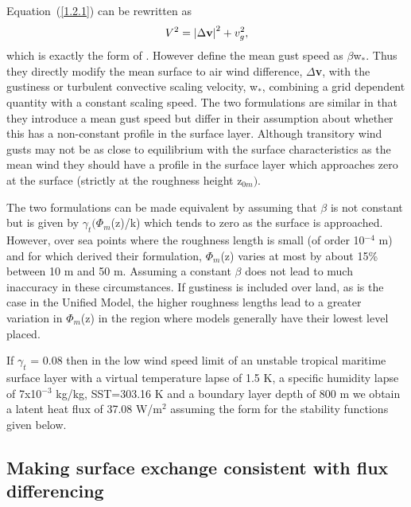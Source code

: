 \documentclass{UMDP_article}
\begin{document}
Equation~(\ref{1.2.1}) can be rewritten as
\begin{equation}
  V^2 = \left| {\Delta {{\rm {\bf v}}}} \right|^2 +  v_g^2,
  \label{1.2.4}
\end{equation}
which is exactly the form of \cite{godfrey1991}. However
\cite{godfrey1991} define the mean gust speed as $\beta $w$_{\ast
}$. Thus they directly modify the mean surface to air wind difference,
$\Delta $\textbf{v}, with the gustiness or turbulent convective
scaling velocity, w$_{\ast }$, combining a grid dependent quantity
with a constant scaling speed. The two formulations are similar in
that they introduce a mean gust speed but differ in their assumption
about whether this has a non-constant profile in the surface
layer. Although transitory wind gusts may not be as close to
equilibrium with the surface characteristics as the mean wind they
should have a profile in the surface layer which approaches zero at
the surface (strictly at the roughness height z$_{0m})$.

The two formulations can be made equivalent by assuming that
\cite{godfrey1991} $\beta $ is not constant but is given by $\gamma
_{t}(\Phi _{m}$(z)/k) which tends to zero as the surface is
approached. However, over sea points where the roughness length is
small (of order 10$^{-4}$ m) and for which \cite{godfrey1991} derived
their formulation, $\Phi_{m}$(z) varies at most by about 15{\%}
between 10 m and 50 m. Assuming a constant $\beta $ does not lead to
much inaccuracy in these circumstances.  If gustiness is included over
land, as is the case in the Unified Model, the higher roughness
lengths lead to a greater variation in $\Phi _{m}$(z) in the region
where models generally have their lowest level placed.

If $\gamma _{t}$ = 0.08 then in the low wind speed limit of an
unstable tropical maritime surface layer with a virtual temperature
lapse of 1.5 K, a specific humidity lapse of 7x10$^{-3}$ kg/kg,
SST=303.16 K and a boundary layer depth of 800 m we obtain a latent
heat flux of 37.08 W/m$^{2}$ assuming the form for the stability
functions given below.


\subsection{Making surface exchange consistent with flux differencing}
\end{document}
